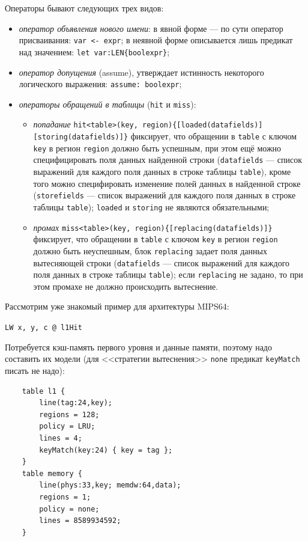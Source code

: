\documentclass[14pt]{extreport}
\begin{document}
Операторы бывают следующих трех видов:
\begin{itemize}
    \item \emph{оператор объявления нового имени}: в явной форме --- по сути оператор присваивания: \texttt{var <- expr}; в неявной форме описывается лишь предикат над значением: \texttt{let var:LEN\{boolexpr\}};
    \item \emph{оператор допущения} (assume), утверждает истинность некоторого логического выражения: \texttt{assume: boolexpr};
    \item \emph{операторы обращений в таблицы} (\texttt{hit} и \texttt{miss}):
        \begin{itemize}
            \item \emph{попадание} \texttt{hit<table>(key, region)\{[loaded(datafields)]}\\\texttt{[storing(datafields)]\}} фиксирует, что обращении в \texttt{table} с ключом \texttt{key} в регион \texttt{region} должно быть успешным, при этом ещё можно специфицировать поля данных найденной строки (\texttt{datafields} --- список выражений для каждого поля данных в строке таблицы \texttt{table}), кроме того можно специфировать изменение полей данных в найденной строке (\texttt{storefields} --- список выражений для каждого поля данных в строке таблицы \texttt{table}); \texttt{loaded} и \texttt{storing} не являются обязательными;
            \item \emph{промах} \texttt{miss<table>(key, region)\{[replacing(datafields)]\}}\\фиксирует, что обращении в \texttt{table} с ключом \texttt{key} в регион \texttt{region} должно быть неуспешным, блок \texttt{replacing} задает поля данных вытесняющей строки (\texttt{datafields} --- список выражений для каждого поля данных в строке таблицы \texttt{table}); если \texttt{replacing} не задано, то при этом промахе не должно происходить вытеснение.
        \end{itemize}
\end{itemize}


Рассмотрим уже знакомый пример для архитектуры MIPS64:

\texttt{LW x, y, c @ l1Hit}

Потребуется кэш-память первого уровня и данные памяти, поэтому надо составить их модели (для <<стратегии вытеснения>> \texttt{none} предикат \texttt{keyMatch} писать не надо):
\begin{verbatim}
    table l1 {
        line(tag:24,key);
        regions = 128;
        policy = LRU;
        lines = 4;
        keyMatch(key:24) { key = tag };
    }
    table memory {
        line(phys:33,key; memdw:64,data);
        regions = 1;
        policy = none;
        lines = 8589934592;
    }
\end{verbatim}
\end{document}
